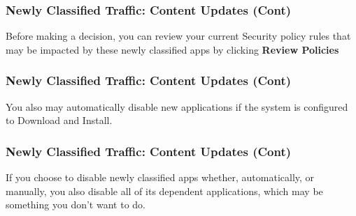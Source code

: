 \subsubsection{Newly Classified Traffic:  Content Updates (Cont)}
Before making a decision, you can review your current Security policy rules that may be impacted by these newly classified apps by clicking \textbf{Review Policies}

\subsubsection{Newly Classified Traffic:  Content Updates (Cont)}
You also may automatically disable new applications if the system is configured to Download and Install.

\subsubsection{Newly Classified Traffic:  Content Updates (Cont)}
If you choose to disable newly classified apps whether, automatically, or manually, you also disable all of its dependent applications, which may be something you don't want to do.

